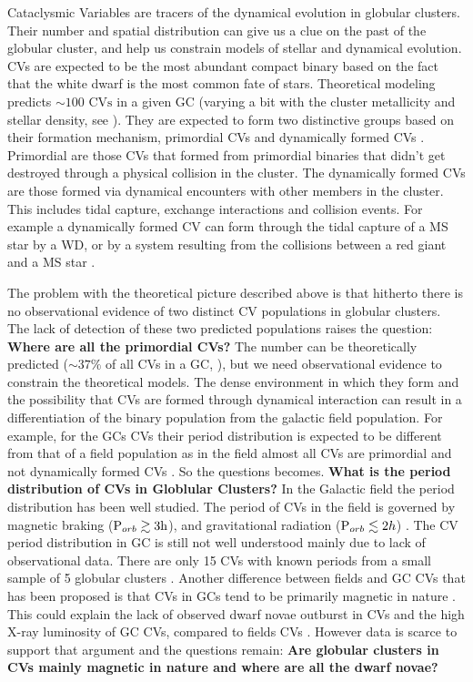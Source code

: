 Cataclysmic Variables are tracers of the dynamical evolution in globular clusters. Their number and spatial distribution can give us a clue on the past of the globular cluster, and help us constrain models of stellar and dynamical evolution. CVs are expected to be the most abundant compact binary based on the fact that the white dwarf is the most common fate of stars. Theoretical modeling predicts $\sim 100 \text{ CVs}$ in a given GC (varying a bit with the cluster metallicity and stellar density, see \citealp{ivanova_formation_2006}). They are expected to form two distinctive groups based on their formation mechanism, primordial CVs and dynamically formed CVs \citep[e.g.][]{hut_binaries_1992}. Primordial are those CVs that formed from primordial binaries that didn't get destroyed through a physical collision in the cluster. The dynamically formed CVs are those formed via dynamical encounters with other members in the cluster. This includes tidal capture, exchange interactions and collision events. For example a dynamically formed CV can form through the tidal capture of a MS star by a WD, or by a system resulting from the collisions between a red giant and a MS star \citep{ivanova_formation_2006}. 

The problem with the theoretical picture described above is that hitherto there is no observational evidence of two distinct CV populations in globular clusters. The lack of detection of these two predicted populations raises the question: \textbf{Where are all the primordial CVs?} The number can be theoretically predicted ($\sim 37 \%$ of all CVs in a GC, \citealt{ivanova_formation_2006}), but we need observational evidence to constrain the theoretical models. The dense environment in which they form and the possibility that CVs are formed through dynamical interaction can result in a differentiation of the binary population from the galactic field population. For example, for the  GCs CVs their period distribution is expected to be different from that of a field population as in the field almost all CVs are primordial and not dynamically formed CVs \citep{ivanova_evolution_2005}. So the questions becomes. \textbf{What is the period distribution of CVs in Globlular Clusters?} In the Galactic field the period distribution has been well studied. The period of CVs in the field is governed by magnetic braking ($\text P _{orb} \gtrsim  3 \text h$), and gravitational radiation ($\text P _{orb} \lesssim 2 h$) \citep{Robinson_period_1983}. The CV period distribution in GC is still not well understood mainly due to lack of observational data. There are only 15 CVs with known periods from a small sample of 5 globular clusters \citep{knigge_cataclysmic_2012}. Another difference between fields and GC CVs that has been proposed is that CVs in GCs tend to be primarily magnetic in nature \citep{grindlay_magnetic_1999}. This could explain the lack of observed dwarf novae outburst in CVs \citep{shara_CVsDN_1996} and the high X-ray luminosity of GC CVs, compared to fields CVs \citep{verbunt_cataclysmic_1997}. However data is scarce to support that argument and the questions remain: \textbf{Are globular clusters in CVs mainly magnetic in nature and where are all the dwarf novae?} 

